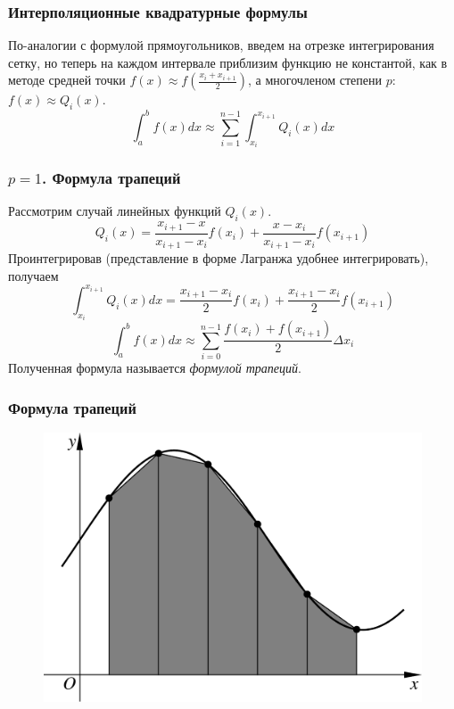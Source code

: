 \documentclass[apectratio=43,unicode]{beamer}
\begin{document}
\begin{frame}
\frametitle{Интерполяционные квадратурные формулы}
	По-аналогии с формулой прямоугольников, введем на отрезке интегрирования сетку, но теперь на каждом
	интервале приблизим функцию не константой, как в методе средней точки $f(x) \approx f\left(\frac{x_i+x_{i+1}}{2}\right)$,
	а многочленом степени $p$: $f(x) \approx Q_i(x)$.
	\[
	\int_a^b f(x) dx\approx \sum_{i=1}^{n-1} \int_{x_i}^{x_{i+1}} Q_i(x) dx
	\]
\end{frame}

\begin{frame}
\frametitle{$p=1$. Формула трапеций}
	Рассмотрим случай линейных функций $Q_i(x)$.
	\[
	Q_i(x) =
	\frac{x_{i+1}-x}{x_{i+1}-x_i} f(x_i) + \frac{x-x_i}{x_{i+1}-x_i} f(x_{i+1})
	\]
	\pause
	Проинтегрировав (представление в форме Лагранжа удобнее интегрировать), получаем
	\[
	\int_{x_i}^{x_{i+1}} Q_i(x) dx = \frac{x_{i+1}-x_i}{2} f(x_i) + \frac{x_{i+1}-x_i}{2} f(x_{i+1})
	\]
	\[
	\int_a^b f(x) dx \approx \sum_{i=0}^{n-1} \frac{f(x_i)+f(x_{i+1})}{2} \Delta x_i
	\]
	Полученная формула называется \emph{формулой трапеций}.
\end{frame}

\begin{frame}
\frametitle{Формула трапеций}
	\begin{figure}%
	\includegraphics[height=.8\textheight]{trap.pdf}%
	\end{figure}
\end{frame}
\end{document}
